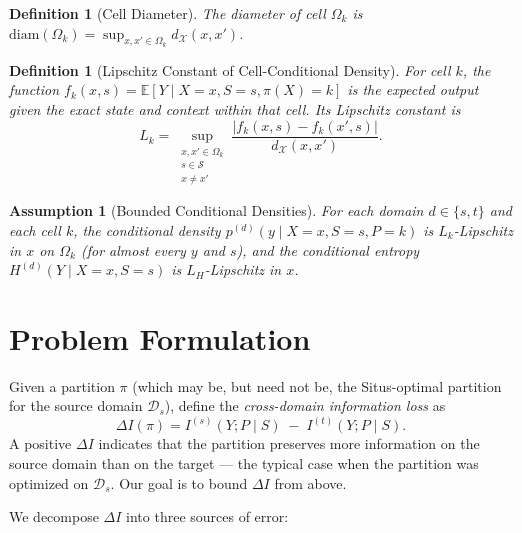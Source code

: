 \documentclass[12pt,a4paper]{article}
\newtheorem{definition}[theorem]{Definition}
\newtheorem{assumption}[theorem]{Assumption}
\newcommand{\E}{\mathbb{E}}
\newcommand{\cX}{\mathcal{X}}
\newcommand{\cS}{\mathcal{S}}
\newcommand{\cD}{\mathcal{D}}
\newcommand{\diam}{\mathrm{diam}}
\begin{document}
\begin{definition}[Cell Diameter]
\label{def:diam}
The diameter of cell $\Omega_k$ is
$\diam(\Omega_k)=\sup_{x,x'\in\Omega_k} d_{\cX}(x,x')$.
\end{definition}

\begin{definition}[Lipschitz Constant of Cell-Conditional Density]
\label{def:lip}
For cell $k$, the function $f_k(x,s)=\E[Y\mid X=x,S=s,\pi(X)=k]$ is the
expected output given the exact state and context within that cell.
Its Lipschitz constant is
\begin{equation}\label{eq:lip}
    L_k = \sup_{\substack{x,x'\in\Omega_k\\ s\in\cS\\ x\neq x'}}
    \frac{|f_k(x,s)-f_k(x',s)|}{d_{\cX}(x,x')}.
\end{equation}
\end{definition}

\begin{assumption}[Bounded Conditional Densities]
\label{ass:bounded}
For each domain $d\in\{s,t\}$ and each cell $k$, the conditional density
$p^{(d)}(y\mid X=x,S=s,P=k)$ is $L_k$-Lipschitz in $x$ on $\Omega_k$
(for almost every $y$ and $s$), and the conditional entropy
$H^{(d)}(Y\mid X=x,S=s)$ is $L_H$-Lipschitz in $x$.
\end{assumption}

\section{Problem Formulation}
\label{sec:formulation}

Given a partition $\pi$ (which may be, but need not be, the Situs-optimal
partition for the source domain $\cD_s$), define the \emph{cross-domain
information loss} as
\begin{equation}\label{eq:delta-I}
    \Delta I(\pi) = I^{(s)}(Y;P\mid S) \;-\; I^{(t)}(Y;P\mid S).
\end{equation}
A positive $\Delta I$ indicates that the partition preserves more
information on the source domain than on the target — the typical case
when the partition was optimized on $\cD_s$.  Our goal is to bound
$\Delta I$ from above.

\medskip\noindent
We decompose $\Delta I$ into three sources of error:
\end{document}
